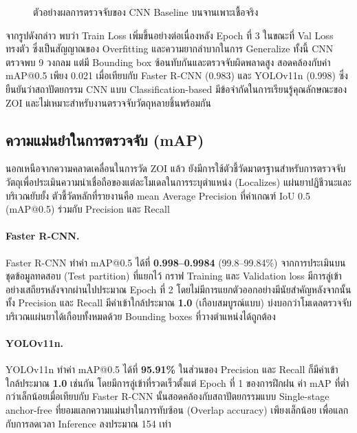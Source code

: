 \begin{figure}[H]
  \centering
  \caption{ตัวอย่างผลการตรวจจับของ CNN Baseline บนจานเพาะเชื้อจริง}
  \label{fig:cnn_detection}
\end{figure}

จากรูปดังกล่าว พบว่า Train Loss เพิ่มขึ้นอย่างต่อเนื่องหลัง Epoch ที่ 3 ในขณะที่ Val Loss ทรงตัว ซึ่งเป็นสัญญาณของ Overfitting และความยากลำบากในการ Generalize ทั้งนี้ CNN ตรวจพบ 9 วงกลม แต่มี Bounding box ซ้อนทับกันและตรวจจับผิดพลาดสูง สอดคล้องกับค่า mAP@0.5 เพียง 0.021 เมื่อเทียบกับ Faster R-CNN (0.983) และ YOLOv11n (0.998) ซึ่งยืนยันว่าสถาปัตยกรรม CNN แบบ Classification-based มีข้อจำกัดในการเรียนรู้คุณลักษณะของ ZOI และไม่เหมาะสำหรับงานตรวจจับวัตถุหลายชิ้นพร้อมกัน
\subsection{ความแม่นยำในการตรวจจับ (mAP)}
\label{subsec:map_accuracy}

นอกเหนือจากความคลาดเคลื่อนในการวัด ZOI แล้ว ยังมีการใช้ตัวชี้วัดมาตรฐานสำหรับการตรวจจับวัตถุเพื่อประเมินความน่าเชื่อถือของแต่ละโมเดลในการระบุตำแหน่ง (Localizes) แผ่นยาปฏิชีวนะและบริเวณยับยั้ง
ตัวชี้วัดหลักที่รายงานคือ mean Average Precision ที่ค่าเกณฑ์ IoU 0.5 (mAP@0.5) ร่วมกับ Precision และ Recall

\paragraph{Faster R-CNN.}
Faster R-CNN ทำค่า mAP@0.5 ได้ที่ \textbf{0.998--0.9984} (99.8--99.84\%)
จากการประเมินบนชุดข้อมูลทดสอบ (Test partition) ที่แยกไว้
กราฟ Training และ Validation loss มีการลู่เข้าอย่างเสถียรหลังจากผ่านไปประมาณ Epoch ที่ 2 โดยไม่มีการแยกตัวออกอย่างมีนัยสำคัญหลังจากนั้น
ทั้ง Precision และ Recall มีค่าเข้าใกล้ประมาณ \textbf{1.0} (เกือบสมบูรณ์แบบ) บ่งบอกว่าโมเดลตรวจจับบริเวณแผ่นยาได้เกือบทั้งหมดด้วย Bounding boxes ที่วางตำแหน่งได้ถูกต้อง

\paragraph{YOLOv11n.}
YOLOv11n ทำค่า mAP@0.5 ได้ที่ \textbf{95.91\%}
ในส่วนของ Precision และ Recall ก็มีค่าเข้าใกล้ประมาณ \textbf{1.0} เช่นกัน โดยมีการลู่เข้าที่รวดเร็วตั้งแต่ Epoch ที่ 1 ของการฝึกฝน
ค่า mAP ที่ต่ำกว่าเล็กน้อยเมื่อเทียบกับ Faster R-CNN นั้นสอดคล้องกับสถาปัตยกรรมแบบ Single-stage anchor-free ที่ยอมแลกความแม่นยำในการทับซ้อน (Overlap accuracy) เพียงเล็กน้อย เพื่อแลกกับการลดเวลา Inference ลงประมาณ 154 เท่า


